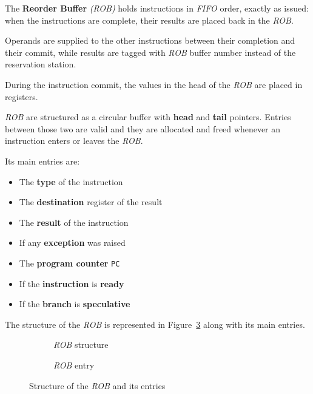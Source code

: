 \documentclass[english]{article}
\begin{document}
The \textbf{Reorder Buffer} \textit{(\textit{ROB})} holds instructions in \textit{FIFO} order, exactly as issued:
when the instructions are complete, their results are placed back in the \textit{ROB}.

Operands are supplied to the other instructions between their completion and their commit, while results are tagged with \textit{ROB} buffer number instead of the reservation station.

During the instruction commit, the values in the head of the \textit{ROB} are placed in registers.

\bigskip
\textit{ROB} are structured as a circular buffer with \textbf{head} and \textbf{tail} pointers.
Entries between those two are valid and they are allocated and freed whenever an instruction enters or leaves the \textit{ROB}.

Its main entries are:

\begin{itemize}
  \item The \textbf{type} of the instruction
  \item The \textbf{destination} register of the result
  \item The \textbf{result} of the instruction
  \item If any \textbf{exception} was raised
  \item The \textbf{program counter} \texttt{PC}
  \item If the \textbf{instruction} is \textbf{ready}
  \item If the \textbf{branch} is \textbf{speculative}
\end{itemize}

\bigskip
The structure of the \textit{ROB} is represented in Figure~\ref{fig:structure-of-ROB} along with its main entries.

\begin{figure}[htpb]
  \bigskip
  \centering
  \begin{subfigure}[]{\textwidth}
    \centering
    \caption{\textit{ROB} structure}
    \label{subfig:structure-rob}
  \end{subfigure}
  \par\bigskip
  \begin{subfigure}[]{\textwidth}
    \centering
    \caption{\textit{ROB} entry}
    \label{subfig:rob-entries}
  \end{subfigure}
  \caption{Structure of the \textit{ROB} and its entries}
  \label{fig:structure-of-ROB}
  \bigskip
\end{figure}
\end{document}
